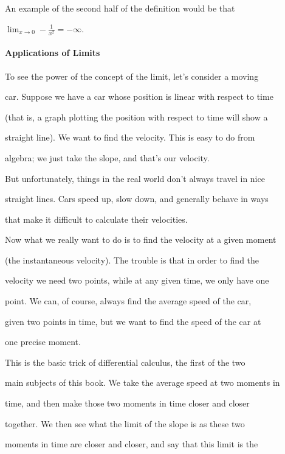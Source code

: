 An example of the second half of the definition would be that

$\lim_{x\to0}-\frac{1}{x^2}=-\infty$.



\paragraph{Applications of Limits}



To see the power of the concept of the limit, let's consider a moving

car. Suppose we have a car whose position is linear with respect to time

(that is, a graph plotting the position with respect to time will show a

straight line). We want to find the velocity. This is easy to do from

algebra; we just take the slope, and that's our velocity.



But unfortunately, things in the real world don't always travel in nice

straight lines. Cars speed up, slow down, and generally behave in ways

that make it difficult to calculate their velocities.



Now what we really want to do is to find the velocity at a given moment

(the instantaneous velocity). The trouble is that in order to find the

velocity we need two points, while at any given time, we only have one

point. We can, of course, always find the average speed of the car,

given two points in time, but we want to find the speed of the car at

one precise moment.



This is the basic trick of differential calculus, the first of the two

main subjects of this book. We take the average speed at two moments in

time, and then make those two moments in time closer and closer

together. We then see what the limit of the slope is as these two

moments in time are closer and closer, and say that this limit is the

